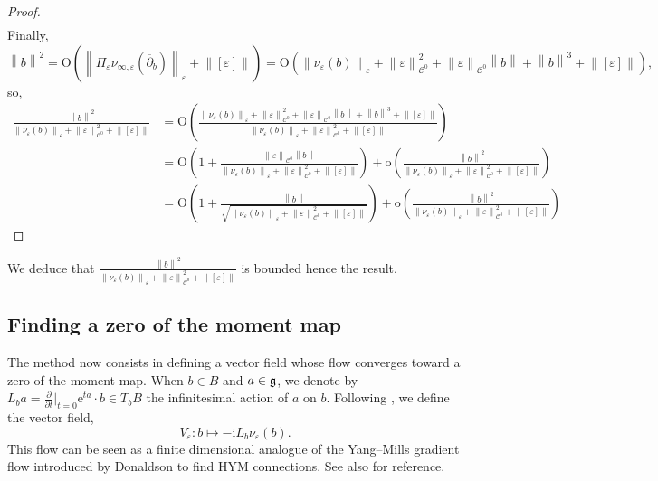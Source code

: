 \documentclass{article}
\theoremstyle{remark}
\theoremstyle{definition}
\renewcommand{\i}{\boldsymbol{\mathrm{i}}}
\newcommand{\e}{\boldsymbol{\mathrm{e}}}
\newcommand{\norme}[1]{\left\| #1 \right\|}
\newcommand{\dbar}{\overline{\partial}}
\newcommand{\mC}{\mathcal{C}}
\begin{document}
\begin{proof}
\begin{align*}
\end{align*}
Finally,
$$
\norme{b}^2 = \mathrm{O}\!\left(\norme{\Pi_\varepsilon\nu_{\infty,\varepsilon}(\dbar_b)}_\varepsilon + \norme{[\varepsilon]}\right) = \mathrm{O}(\norme{\nu_\varepsilon(b)}_\varepsilon + \norme{\varepsilon}_{\mC^0}^2 + \norme{\varepsilon}_{\mC^0}\norme{b} + \norme{b}^3 + \norme{[\varepsilon]}),
$$
so,
\begin{align*}
    \frac{\norme{b}^2}{\norme{\nu_\varepsilon(b)}_\varepsilon + \norme{\varepsilon}_{\mC^0}^2 + \norme{[\varepsilon]}} & = \mathrm{O}\!\left(\frac{\norme{\nu_\varepsilon(b)}_\varepsilon + \norme{\varepsilon}_{\mC^0}^2 + \norme{\varepsilon}_{\mC^0}\norme{b} + \norme{b}^3 + \norme{[\varepsilon]}}{\norme{\nu_\varepsilon(b)}_\varepsilon + \norme{\varepsilon}_{\mC^0}^2 + \norme{[\varepsilon]}}\right)\\
    & = \mathrm{O}\!\left(1 + \frac{\norme{\varepsilon}_{\mC^0}\norme{b}}{\norme{\nu_\varepsilon(b)}_\varepsilon + \norme{\varepsilon}_{\mC^0}^2 + \norme{[\varepsilon]}}\right) + \mathrm{o}\!\left(\frac{\norme{b}^2}{\norme{\nu_\varepsilon(b)}_\varepsilon + \norme{\varepsilon}_{\mC^0}^2 + \norme{[\varepsilon]}}\right)\\
    & = \mathrm{O}\!\left(1 + \frac{\norme{b}}{\sqrt{\norme{\nu_\varepsilon(b)}_\varepsilon + \norme{\varepsilon}_{\mC^0}^2 + \norme{[\varepsilon]}}}\right) + \mathrm{o}\!\left(\frac{\norme{b}^2}{\norme{\nu_\varepsilon(b)}_\varepsilon + \norme{\varepsilon}_{\mC^0}^2 + \norme{[\varepsilon]}}\right)
\end{align*}
\end{proof}
We deduce that $\frac{\norme{b}^2}{\norme{\nu_\varepsilon(b)}_\varepsilon + \norme{\varepsilon}_{\mC^0}^2 + \norme{[\varepsilon]}}$ is bounded hence the result.

\subsection{Finding a zero of the moment map}

The method now consists in defining a vector field whose flow converges toward a zero of the moment map. When $b \in B$ and $a \in \frak{g}$, we denote by $L_ba = \frac{\partial}{\partial t}|_{t = 0}\e^{ta} \cdot b \in T_bB$ the infinitesimal action of $a$ on $b$. Following \cite[Chapter 3]{GRS}, we define the vector field,
$$
V_\varepsilon : b \mapsto -\i L_b\nu_\varepsilon(b).
$$
This flow can be seen as a finite dimensional analogue of the Yang--Mills gradient flow introduced by Donaldson \cite{Donaldson} to find HYM connections. See also \cite[Chapter 6]{Kobayashi} for reference.
\end{document}

